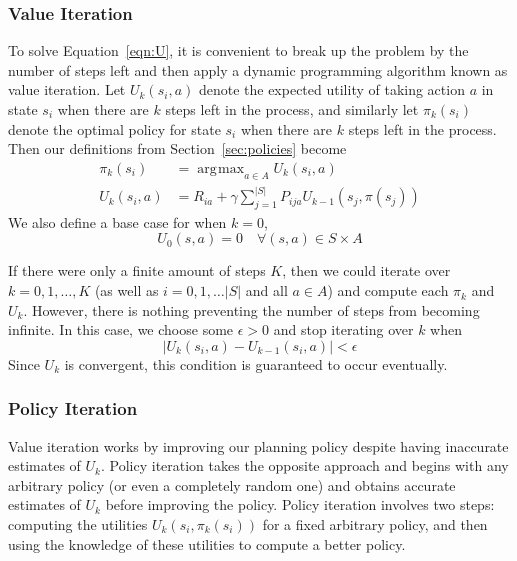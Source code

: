 \documentclass[tog]{acmsiggraph}
\DeclareMathOperator*{\argmax}{\arg\!\max}
\begin{document}
\subsubsection{Value Iteration}

To solve Equation~\ref{eqn:U}, it is convenient to break up the problem by the number 
of steps left and then apply a dynamic programming algorithm known as value iteration. 
Let $U_k \left( s_i, a \right)$ denote the expected utility of taking action $a$ 
in state $s_i$ when there are $k$ steps left in the process, and similarly let 
$\pi_k \left(s_i \right)$ denote the optimal policy for state $s_i$ when there are $k$ steps 
left in the process. Then our definitions from Section~\ref{sec:policies} become
\begin{equation*}
  \begin{split}
    \pi_k \left(s_i \right) &= \argmax_{a \in A} U_k \left( s_i, a \right) \\
    U_k \left( s_i, a \right) &= R_{ia} + \gamma \sum_{j=1}^{\left| S \right|} P_{ija} U_{k-1} \left( s_j, \pi \left( s_j \right) \right)
  \end{split}
\end{equation*}
We also define a base case for when $k=0$,
\begin{equation*}
  U_0 \left( s, a \right) = 0 \quad \forall \left( s, a \right) \in S \times A
\end{equation*}

If there were only a finite amount of steps $K$, then we could iterate over $k = 0, 1, \ldots, K$ 
(as well as $i = 0, 1, \ldots |S|$ and all $a \in A$) and compute each $\pi_k$ and $U_k$. 
However, there is nothing preventing the number of steps from becoming infinite. 
In this case, we choose some $\epsilon > 0$ and stop iterating over $k$ when
\begin{equation*}
  \left| U_k\left( s_i, a \right) - U_{k-1}\left( s_i, a \right) \right| < \epsilon
\end{equation*}
Since $U_k$ is convergent, this condition is guaranteed to occur eventually.

\subsubsection{Policy Iteration}
\label{sec:policyIteration}

Value iteration works by improving our planning policy despite having inaccurate 
estimates of $U_k$. Policy iteration takes the opposite approach and begins with 
any arbitrary policy (or even a completely random one) and obtains accurate estimates 
of $U_k$ before improving the policy. Policy iteration involves two steps: computing 
the utilities $U_k \left(s_i, \pi_k \left(s_i \right) \right)$ for a fixed arbitrary policy, and then 
using the knowledge of these utilities to compute a better policy.
\end{document}

